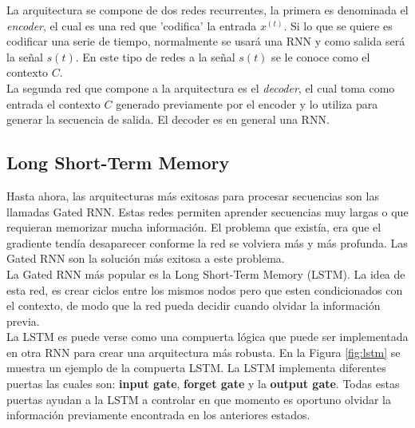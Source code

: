     La arquitectura se compone de dos redes recurrentes, la primera es denominada el \textit{encoder}, el cual es una red que 'codifica' la entrada $x^{(t)}$. Si lo que se quiere es codificar una serie de tiempo, normalmente se usará una RNN y como salida será la señal $s(t)$. En este tipo de redes a la señal $s(t)$ se le conoce como el contexto $C$. \\
    
    La segunda red que compone a la arquitectura es el \textit{decoder}, el cual toma como entrada el contexto $C$ generado previamente por el encoder y lo utiliza para generar la secuencia de salida. El decoder es en general una RNN.
    
    \subsection{Long Short-Term Memory}
   	Hasta ahora, las arquitecturas más exitosas para procesar secuencias son las llamadas Gated RNN. Estas redes permiten aprender secuencias muy largas o que requieran memorizar mucha información. El problema que existía, era que el gradiente tendía desaparecer conforme la red se volviera más y más profunda. Las Gated RNN son la solución más exitosa a este problema. \\
   	
   	La Gated RNN más popular es la Long Short-Term Memory (LSTM). La idea de esta red, es crear ciclos entre los mismos nodos pero que esten condicionados con el contexto, de modo que la red pueda decidir cuando olvidar la información previa. \\
   	
   	La LSTM es puede verse como una compuerta lógica que puede ser implementada en otra RNN para crear una arquitectura más robusta. En la Figura \ref{fig:lstm} se muestra un ejemplo de la compuerta LSTM. La LSTM implementa diferentes puertas las cuales son: \textbf{input gate}, \textbf{forget gate} y la \textbf{output gate}. Todas estas puertas ayudan a la LSTM a controlar en que momento es oportuno olvidar la información previamente encontrada en los anteriores estados. \\
   	
